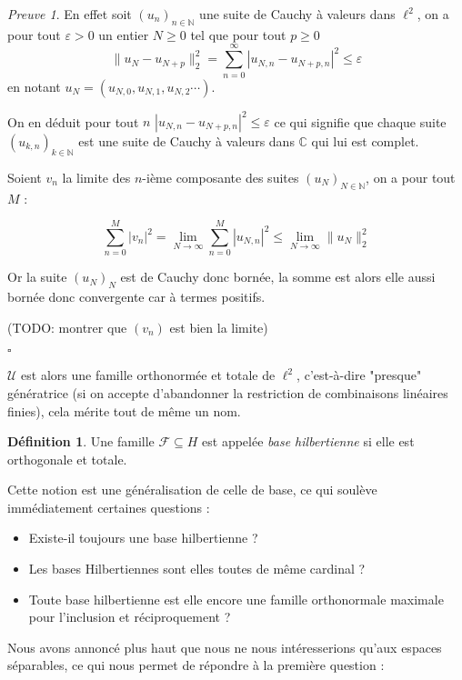 \documentclass[]{article}
\theoremstyle{remark}
\newtheorem{myproof}{Preuve}
\theoremstyle{definition}
\newtheorem{mydef}{Définition}
\newcommand{\cqfd}{
	\hfill$\square$
}
\begin{document}
	\begin{myproof}
		En effet soit $(u_n)_{n \in \mathbb{N}}$ une suite de Cauchy à valeurs dans $\ell^2$, on a pour tout $\varepsilon > 0$ un entier $N \geqslant 0$ tel que pour tout $p \geqslant 0$ $$\|u_N - u_{N+p}\|^2_2 = \sum_{n=0}^{\infty} |u_{N, n} - u_{N+p, n}|^2 \leqslant \varepsilon$$
		en notant $u_N=(u_{N, 0}, u_{N, 1}, u_{N, 2} \cdots)$.
		
		On en déduit pour tout $n$ $|u_{N, n} - u_{N+p, n}|^2 \leqslant \varepsilon$ ce qui signifie que chaque suite $(u_{k, n})_{k \in \mathbb{N}}$ est une suite de Cauchy à valeurs dans $\mathbb{C}$ qui lui est complet.
		
		Soient $v_n$ la limite des $n$-ième composante des suites $(u_N)_{N \in \mathbb{N}}$, on a pour tout $M$ :
		
		$$\sum_{n=0}^{M} |v_n|^2 = \lim\limits_{N \to \infty} \sum_{n=0}^{M} |u_{N, n}|^2 \leqslant \lim\limits_{N\to \infty} \|u_N\|_2^2$$
		
		Or la suite $(u_N)_N$ est de Cauchy donc bornée, la somme est alors elle aussi bornée donc convergente car à termes positifs.
		
		(TODO: montrer que $(v_n)$ est bien la limite)
		
		\cqfd
	\end{myproof}
	
	$\mathcal{U}$ est alors une famille orthonormée et totale de $\ell^2$, c'est-à-dire "presque" génératrice (si on accepte d'abandonner la restriction de combinaisons linéaires finies), cela mérite tout de même un nom.
	
	\begin{mydef}
		Une famille $\mathcal{F} \subseteq H$ est appelée \textit{base hilbertienne} si elle est orthogonale et totale.
	\end{mydef}
	
	Cette notion est une généralisation de celle de base, ce qui soulève immédiatement certaines questions :
	
	\begin{itemize}
		\item Existe-il toujours une base hilbertienne ?
		\item Les bases Hilbertiennes sont elles toutes de même cardinal ?
		\item Toute base hilbertienne est elle encore une famille orthonormale maximale pour l'inclusion et réciproquement ?
	\end{itemize}
	
	Nous avons annoncé plus haut que nous ne nous intéresserions qu'aux espaces séparables, ce qui nous permet de répondre à la première question :
	
\end{document}
